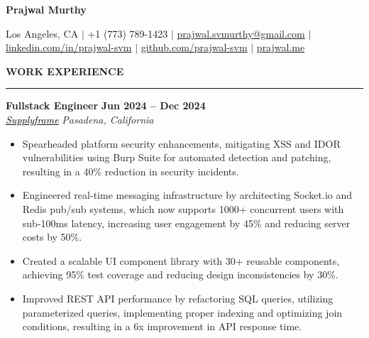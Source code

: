\documentclass[10pt,letterpaper]{article}
\begin{document}
{\centering\huge\textbf{Prajwal Murthy}\par}
\vspace{2mm}
{\centering\small{Los Angeles, CA $|$ +1 (773) 789-1423 $|$  \href{mailto:prajwal.svmurthy@gmail.com}{prajwal.svmurthy@gmail.com} $|$ \href{https://linkedin.com/in/prajwal-svm}{linkedin.com/in/prajwal-svm} $|$  \href{https://github.com/prajwal-svm}{github.com/prajwal-svm}  $|$   \href{https://prajwal.me}{prajwal.me}}\par}
\vspace{1mm}

{\hspace{0in}\small\textbf{WORK EXPERIENCE}}\par
\vspace{-2mm}
\noindent\rule{\textwidth}{0.1pt}
\vspace{-4mm}

\hspace{0in}\textbf{Fullstack Engineer} \hfill \textbf{Jun 2024 -- Dec 2024}\\
\hspace{0in}\textit{\href{https://supplyframe.com}{\textcolor{black}{Supplyframe}}} \hfill \textit{Pasadena, California} 
\begin{itemize}[leftmargin=0.15in,nosep,topsep=3pt,itemsep=1mm]
   \item Spearheaded platform security enhancements, mitigating XSS and IDOR vulnerabilities using Burp Suite for automated detection and patching, resulting in a 40\% reduction in security incidents.
   \item Engineered real-time messaging infrastructure by architecting Socket.io and Redis pub/sub systems, which now supports 1000+ concurrent users with sub-100ms latency, increasing user engagement by 45\% and reducing server costs by 50\%.
   \item Created a scalable UI component library with 30+ reusable components, achieving 95\% test coverage and reducing design inconsistencies by 30\%.
   \item Improved REST API performance by refactoring SQL queries, utilizing parameterized queries, implementing proper indexing and optimizing join conditions, resulting in a 6x improvement in API response time.
\end{itemize}
\end{document}
